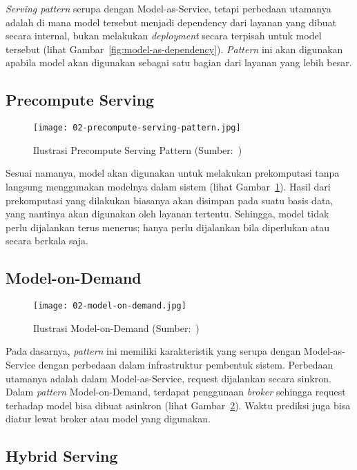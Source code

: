 \textit{Serving pattern} serupa dengan Model-as-Service, tetapi perbedaan utamanya adalah di mana model tersebut menjadi dependency dari layanan yang dibuat secara internal, bukan melakukan \textit{deployment} secara terpisah untuk model tersebut (lihat Gambar~\ref{fig:model-as-dependency}).
\textit{Pattern} ini akan digunakan apabila model akan digunakan sebagai satu bagian dari layanan yang lebih besar.

\subsection{Precompute Serving}

\begin{figure}
  \centering
  \texttt{[image: 02-precompute-serving-pattern.jpg]}
  \caption{Ilustrasi Precompute Serving Pattern (Sumber:~\cite{book-handsonml})}\label{fig:precompute-serving}
\end{figure}

Sesuai namanya, model akan digunakan untuk melakukan prekomputasi tanpa langsung menggunakan modelnya dalam sistem (lihat Gambar~\ref{fig:precompute-serving}).
Hasil dari prekomputasi yang dilakukan biasanya akan disimpan pada suatu basis data, yang nantinya akan digunakan oleh layanan tertentu.
Sehingga, model tidak perlu dijalankan terus menerus; hanya perlu dijalankan bila diperlukan atau secara berkala saja.

\subsection{Model-on-Demand}

\begin{figure}
  \centering
  \texttt{[image: 02-model-on-demand.jpg]}
  \caption{Ilustrasi Model-on-Demand (Sumber:~\cite{book-handsonml})}\label{fig:model-on-demand}
\end{figure}

Pada dasarnya, \textit{pattern} ini memiliki karakteristik yang serupa dengan Model-as-Service dengan perbedaan dalam infrastruktur pembentuk sistem.
Perbedaan utamanya adalah dalam Model-as-Service, request dijalankan secara sinkron.
Dalam \textit{pattern} Model-on-Demand, terdapat penggunaan \textit{broker}  sehingga request terhadap model bisa dibuat asinkron (lihat Gambar~\ref{fig:model-on-demand}).
Waktu prediksi juga bisa diatur lewat broker atau model yang digunakan.

\subsection{Hybrid Serving}

